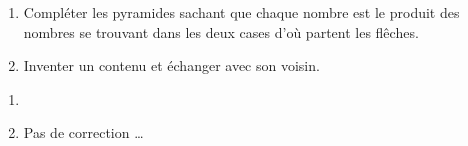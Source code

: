 \numeroteEnigme
\begin{enigme}
    \begin{enumerate}
        \item Compléter les pyramides sachant que chaque nombre est le produit
        des nombres se trouvant dans les deux cases d'où partent les flêches.    

        \hfill
        \hfill
        \pagebreak
        \item Inventer un contenu et échanger avec son voisin.
        \begin{center}
        \end{center}
    \end{enumerate}
\end{enigme}
  
\addtocounter{exercice}{-1}
\begin{corrige}
    \begin{enumerate}
        \item \phantom{rrr}
        \hfill
        \hfill
        \item Pas de correction \ldots
    \end{enumerate}
\end{corrige}